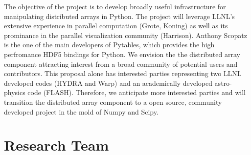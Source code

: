 \documentclass[letterpaper,11pt]{article}
\begin{document}
The objective of the project is to develop broadly useful infrastructure for manipulating distributed arrays in Python.  The project will leverage LLNL's extensive experience in parallel computation (Grote, Koning) as well as its prominance in the parallel visualization community (Harrison).  Anthony Scopatz is the one of the main developers of Pytables\cite{pytables}, which provides the high perfromance HDF5 bindings for Python.  We envision the the distributed array component attracting interest from a broad community of potential users and contributors.  This proposal alone has interested parties representing two LLNL developed codes (HYDRA and Warp) and an academically developed astro-physics code (FLASH).  Therefore, we anticipate more interested parties and will transition the distributed array component to a open source, community developed project in the mold of Numpy and Scipy.




\section*{Research Team}
\end{document}
